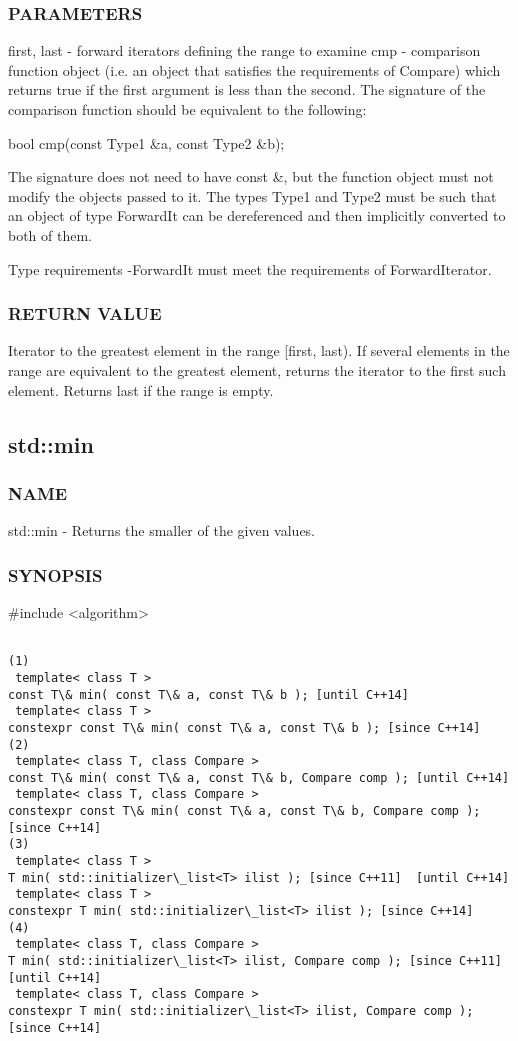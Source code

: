 \subsubsection{PARAMETERS}
first, last - forward iterators defining the range to examine
cmp - comparison function object (i.e. an object that satisfies the requirements of Compare) which returns true if the first argument is less than the second.
The signature of the comparison function should be equivalent to the following:

 bool cmp(const Type1 \&a, const Type2 \&b);

The signature does not need to have const \&, but the function object must not modify the objects passed to it.
The types Type1 and Type2 must be such that an object of type ForwardIt can be dereferenced and then implicitly converted to both of them.

 Type requirements
 -ForwardIt must meet the requirements of ForwardIterator.

\subsubsection{RETURN VALUE}
Iterator to the greatest element in the range [first, last). If several elements in the range are equivalent to the greatest element, returns the iterator to the first such element. Returns last if the range is empty.



\subsection{std::min}

\subsubsection{NAME}
std::min - Returns the smaller of the given values.

\subsubsection{SYNOPSIS}
\#include <algorithm>

\begin{lstlisting}

(1)
 template< class T >
const T\& min( const T\& a, const T\& b ); [until C++14]
 template< class T >
constexpr const T\& min( const T\& a, const T\& b ); [since C++14]
(2)
 template< class T, class Compare >
const T\& min( const T\& a, const T\& b, Compare comp ); [until C++14]
 template< class T, class Compare >
constexpr const T\& min( const T\& a, const T\& b, Compare comp ); [since C++14]
(3)
 template< class T >
T min( std::initializer\_list<T> ilist ); [since C++11]  [until C++14]
 template< class T >
constexpr T min( std::initializer\_list<T> ilist ); [since C++14]
(4)
 template< class T, class Compare >
T min( std::initializer\_list<T> ilist, Compare comp ); [since C++11]  [until C++14]
 template< class T, class Compare >
constexpr T min( std::initializer\_list<T> ilist, Compare comp ); [since C++14]
\end{lstlisting}

